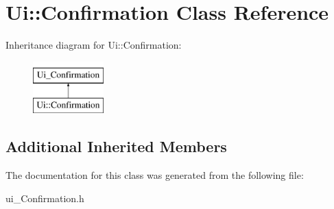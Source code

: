 \hypertarget{class_ui_1_1_confirmation}{\section{Ui\-:\-:Confirmation Class Reference}
\label{class_ui_1_1_confirmation}
}
Inheritance diagram for Ui\-:\-:Confirmation\-:\begin{figure}[H]
\begin{center}
\leavevmode
\includegraphics[height=2.000000cm]{class_ui_1_1_confirmation}
\end{center}
\end{figure}
\subsection*{Additional Inherited Members}


The documentation for this class was generated from the following file\-:\begin{DoxyCompactItemize}
\item 
ui\-\_\-\-Confirmation.\-h\end{DoxyCompactItemize}
